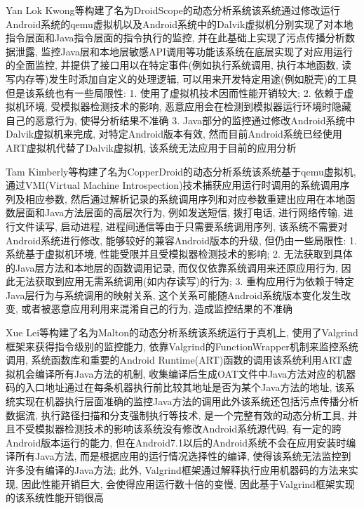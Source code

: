 Yan Lok Kwong等构建了名为DroidScope的动态分析系统\juhao 该系统通过修改运行Android系统的qemu虚拟机以及Android系统中的Dalvik虚拟机分别实现了对本地指令层面和Java指令层面的指令执行的监控, 并在此基础上实现了污点传播分析数据泄露, 监控Java层和本地层敏感API调用等功能\juhao 该系统在底层实现了对应用运行的全面监控, 并提供了接口用以在特定事件(例如执行系统调用, 执行本地函数, 读写内存等)发生时添加自定义的处理逻辑, 可以用来开发特定用途(例如脱壳)的工具\juhao 但是该系统也有一些局限性: 
1. 使用了虚拟机技术因而性能开销较大; 
2. 依赖于虚拟机环境, 受模拟器检测技术的影响, 恶意应用会在检测到模拟器运行环境时隐藏自己的恶意行为, 使得分析结果不准确
3. Java部分的监控通过修改Android系统中Dalvik虚拟机来完成, 对特定Android版本有效, 然而目前Android系统已经使用ART虚拟机代替了Dalvik虚拟机, 该系统无法应用于目前的应用分析\juhao

Tam Kimberly等构建了名为CopperDroid的动态分析系统\juhao 该系统基于qemu虚拟机, 通过VMI(Virtual Machine Introspection)技术捕获应用运行时调用的系统调用序列及相应参数, 然后通过解析记录的系统调用序列和对应参数重建出应用在本地函数层面和Java方法层面的高层次行为, 例如发送短信, 拨打电话, 进行网络传输, 进行文件读写, 启动进程, 进程间通信等\juhao 由于只需要系统调用序列, 该系统不需要对Android系统进行修改, 能够较好的兼容Android版本的升级, 但仍由一些局限性:
1. 系统基于虚拟机环境, 性能受限并且受模拟器检测技术的影响;
2. 无法获取到具体的Java层方法和本地层的函数调用记录, 而仅仅依靠系统调用来还原应用行为, 因此无法获取到应用无需系统调用(如内存读写)的行为;
3. 重构应用行为依赖于特定Java层行为与系统调用的映射关系, 这个关系可能随Android系统版本变化发生改变, 或者被恶意应用利用来混淆自己的行为, 造成监控结果的不准确\juhao

Xue Lei等构建了名为Malton的动态分析系统\juhao 该系统运行于真机上, 使用了Valgrind框架来获得指令级别的监控能力, 依靠Valgrind的FunctionWrapper机制来监控系统调用, 系统函数库和重要的Android Runtime(ART)函数的调用\juhao 该系统利用ART虚拟机会编译所有Java方法的机制, 收集编译后生成OAT文件中Java方法对应的机器码的入口地址\juhao 通过在每条机器执行前比较其地址是否为某个Java方法的地址, 该系统实现在机器执行层面准确的监控Java方法的调用\juhao 此外该系统还包括污点传播分析数据流, 执行路径扫描和分支强制执行等技术, 是一个完整有效的动态分析工具, 并且不受模拟器检测技术的影响\juhao 该系统没有修改Android系统源代码, 有一定的跨Android版本运行的能力, 但在Android7.1以后的Android系统不会在应用安装时编译所有Java方法, 而是根据应用的运行情况选择性的编译, 使得该系统无法监控到许多没有编译的Java方法; 此外, Valgrind框架通过解释执行应用机器码的方法来实现, 因此性能开销巨大, 会使得应用运行数十倍的变慢, 因此基于Valgrind框架实现的该系统性能开销很高\juhao

